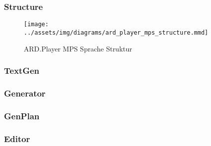\lipsum[5]

\subsubsection{Structure}
\begin{figure}
    \texttt{[image: ../assets/img/diagrams/ard\_player\_mps\_structure.mmd]}
    \caption{ARD.Player MPS Sprache Struktur}
    \label{fig:ard-player-mps-structure}
\end{figure}
\lipsum[5]

\subsubsection{TextGen}
\lipsum[5]

\subsubsection{Generator}
\lipsum[5]

\subsubsection{GenPlan}
\lipsum[5]

\subsubsection{Editor}
\lipsum[5]
